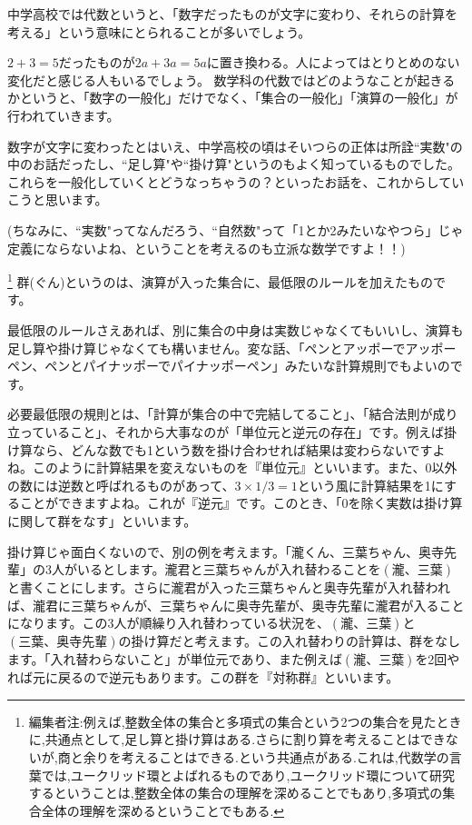 中学高校では代数というと、「数字だったものが文字に変わり、それらの計算を考える」という意味にとられることが多いでしょう。

$2 + 3 = 5$だったものが$2a + 3a = 5a$に置き換わる。人によってはとりとめのない変化だと感じる人もいるでしょう。
数学科の代数ではどのようなことが起きるかというと、「数字の一般化」だけでなく、「集合の一般化」「演算の一般化」が行われていきます。

数字が文字に変わったとはいえ、中学高校の頃はそいつらの正体は所詮``実数"の中のお話だったし、``足し算"や``掛け算"というのもよく知っているものでした。これらを一般化していくとどうなっちゃうの？といったお話を、これからしていこうと思います。

(ちなみに、``実数"ってなんだろう、``自然数"って「1とか2みたいなやつら」じゃ定義にならないよね、ということを考えるのも立派な数学ですよ！！)

\footnote{編集者注:例えば,整数全体の集合と多項式の集合という2つの集合を見たときに,共通点として,足し算と掛け算はある.さらに割り算を考えることはできないが,商と余りを考えることはできる.という共通点がある.これは,代数学の言葉では,ユークリッド環とよばれるものであり,ユークリッド環について研究するということは,整数全体の集合の理解を深めることでもあり,多項式の集合全体の理解を深めるということでもある.}
群(ぐん)というのは、演算が入った集合に、最低限のルールを加えたものです。

最低限のルールさえあれば、別に集合の中身は実数じゃなくてもいいし、演算も足し算や掛け算じゃなくても構いません。変な話、「ペンとアッポーでアッポーペン、ペンとパイナッポーでパイナッポーペン」みたいな計算規則でもよいのです。

必要最低限の規則とは、「計算が集合の中で完結してること」、「結合法則が成り立っていること」、それから大事なのが「単位元と逆元の存在」です。例えば掛け算なら、どんな数でも1という数を掛け合わせれば結果は変わらないですよね。このように計算結果を変えないものを『単位元』といいます。また、0以外の数には逆数と呼ばれるものがあって、$3 \times 1/3 = 1$という風に計算結果を1にすることができますよね。これが『逆元』です。このとき、「0を除く実数は掛け算に関して群をなす」といいます。

掛け算じゃ面白くないので、別の例を考えます。「瀧くん、三葉ちゃん、奥寺先輩」の3人がいるとします。瀧君と三葉ちゃんが入れ替わることを$(瀧、三葉)$と書くことにします。さらに瀧君が入った三葉ちゃんと奥寺先輩が入れ替われば、瀧君に三葉ちゃんが、三葉ちゃんに奥寺先輩が、奥寺先輩に瀧君が入ることになります。この3人が順繰り入れ替わっている状況を、$(瀧、三葉)$と$(三葉、奥寺先輩)$の掛け算だと考えます。この入れ替わりの計算は、群をなします。「入れ替わらないこと」が単位元であり、また例えば$(瀧、三葉)$を2回やれば元に戻るので逆元もあります。この群を『対称群』といいます。

